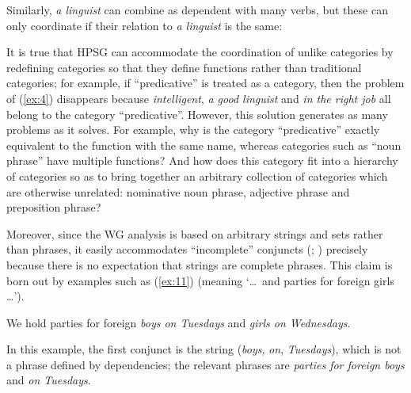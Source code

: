 \documentclass[output=paper,biblatex,babelshorthands,newtxmath,draftmode,colorlinks,citecolor=brown]{langscibook}
\begin{document}
\begin{exe}
	\label{ex:5}

	\label{ex:6}

	\label{ex:7}
\end{exe}

\noindent
Similarly, \emph{a linguist} can combine as dependent with many verbs, but these can only coordinate
if their relation to \emph{a linguist} is the same:

\begin{exe}
	\label{ex:8}

	\label{ex:9}

	\label{ex:10}
\end{exe}

\noindent
It is true that HPSG can accommodate the coordination of unlike categories by redefining categories
so that they define functions rather than traditional categories; for example, if ``predicative'' is
treated as a category, then the problem of (\ref{ex:4}) disappears because \emph{intelligent},
\emph{a good linguist} and \emph{in the right job} all belong to the category
``predicative''. However, this solution generates as many problems as it solves. For example, why is
the category ``predicative'' exactly equivalent to the function with the same name, whereas
categories such as ``noun phrase'' have multiple functions? And how does this category fit into a
hierarchy of categories so as to bring together an arbitrary collection of categories which are
otherwise unrelated: nominative noun phrase, adjective phrase and preposition phrase?

Moreover, since the WG analysis is based on arbitrary strings and sets rather than phrases, it
easily accommodates ``incomplete'' conjuncts (\citealt[405]{Hudson90a-u}; \citealt{Hudson1982})
precisely because there is no expectation that strings are complete phrases. This claim is born out
by examples such as (\ref{ex:11}) (meaning `\dots\ and parties for foreign girls \dots').

\begin{exe}
	\ex \label{ex:11} We hold parties for foreign \emph{boys on Tuesdays} and \emph{girls on Wednesdays}.
\end{exe}
In this example, the first conjunct is the string (\emph{boys}, \emph{on}, \emph{Tuesdays}), which
is not a phrase defined by dependencies; the relevant phrases are \emph{parties for foreign boys}
and \emph{on Tuesdays}.
\end{document}
